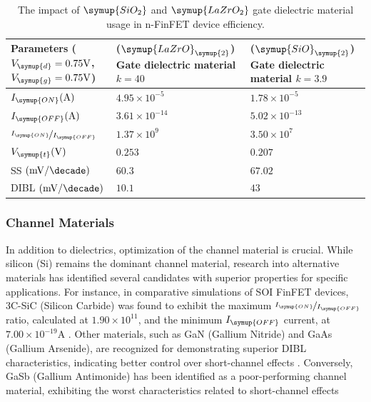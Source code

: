	\begin{table}[]
	\centering
	\begin{tabular}{lll}
		\hline
		Parameters ($V_{\symup{d}}=0.75\unit{\volt}$, $V_{\symup{g}}=0.75\unit{\volt}$) & ($\symup{LaZrO}_{\symup{2}}$) Gate dielectric material $k = 40$ & ($\symup{SiO}_{\symup{2}}$) Gate dielectric material $k = 3.9$ \\
		\hline \hline
		$I_{\symup{ON}} (\unit{\ampere})$                            & $4.95 \times 10^{-5}$        & $1.78 \times 10^{-5}$        \\
		$I_{\symup{OFF}} (\unit{\ampere})$                           & $3.61 \times 10^{-14}$       & $5.02 \times 10^{-13}$       \\
		$\displaystyle\nicefrac{I_{\symup{ON}}}{I_{\symup{OFF}}}$    & $1.37 \times 10^{9}$         & $3.50 \times 10^{7}$         \\
		$V_{\symup{t}} (\unit{\volt})$                               & $0.253$                      & $0.207$                      \\
		SS $(\unit{{\milli\volt}\per{\decade}})$                     & $60.3$                       & $67.02$                      \\
		DIBL $(\unit{{\milli\volt}\per{\decade}})$                   & $10.1$                       & $43$                         \\
		\hline
	\end{tabular}
	\caption{The impact of $\symup{SiO_2}$ and $\symup{LaZrO_2}$ gate dielectric material usage in n-FinFET device efficiency.}
	\label{tab:gate-dielectrics}
\end{table}


	\subsubsection{Channel Materials}
	In addition to dielectrics, optimization of the channel material is crucial. While silicon (Si) remains the dominant channel material, research into alternative materials has identified several candidates with superior properties for specific applications. For instance, in comparative simulations of SOI FinFET devices, 3C-SiC (Silicon Carbide) was found to exhibit the maximum $\nicefrac{I_{\symup{ON}}}{I_{\symup{OFF}}}$ ratio, calculated at $1.90 \times 10^{11}$, and the minimum $I_{\symup{OFF}}$ current, at $7.00 \times 10^{-19}\unit{\ampere}$ \cite{FinFET1}. Other materials, such as GaN (Gallium Nitride) and GaAs (Gallium Arsenide), are recognized for demonstrating superior DIBL characteristics, indicating better control over short-channel effects \cite{FinFET1}. Conversely, GaSb (Gallium Antimonide) has been identified as a poor-performing channel material, exhibiting the worst characteristics related to short-channel effects \cite{FinFET1}\par

